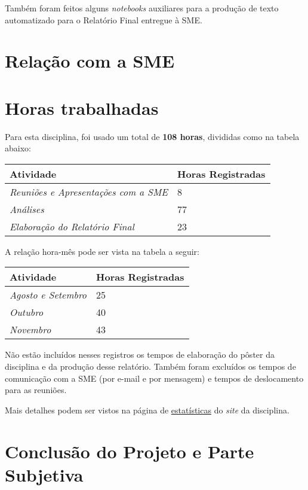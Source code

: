 \documentclass[12pt, a4paper]{article}
\begin{document}
Também foram feitos alguns \textit{notebooks} auxiliares para a produção de texto automatizado para o Relatório Final entregue à SME.

\section{Relação com a SME}

\section{Horas trabalhadas}

Para esta disciplina, foi usado um total de \textbf{108 horas}, divididas como na tabela abaixo:

\begin{table}[H]
	\centering
	\begin{tabular}{l|l}
		\textbf{Atividade}                                   & \textbf{Horas Registradas} \\ \hline
		\textit{Reuniões e Apresentações com a SME} & 8                          \\ \hline
		\textit{Análises}                           & 77                         \\ \hline
		\textit{Elaboração do Relatório Final}    & 23                         \\ 
	\end{tabular}
\end{table}

A relação hora-mês pode ser vista na tabela a seguir:

\begin{table}[H]
	\centering
	\begin{tabular}{l|l}
		\textbf{Atividade}                                   & \textbf{Horas Registradas} \\ \hline
		\textit{Agosto e Setembro} & 25                          \\ \hline
		\textit{Outubro}                           & 40                         \\ \hline
		\textit{Novembro}    & 43                         \\ 
	\end{tabular}
\end{table}

Não estão incluídos nesses registros os tempos de elaboração do pôster da disciplina e da produção desse relatório. Também foram excluídos os tempos de comunicação com a SME (por e-mail e por mensagem) e tempos de deslocamento para as reuniões. 

Mais detalhes podem ser vistos na página de \href{https://lsflp.github.io/MAC0213/estatisticas.html}{estatísticas} do \textit{site} da disciplina.

\section{Conclusão do Projeto e Parte Subjetiva}
\end{document}
